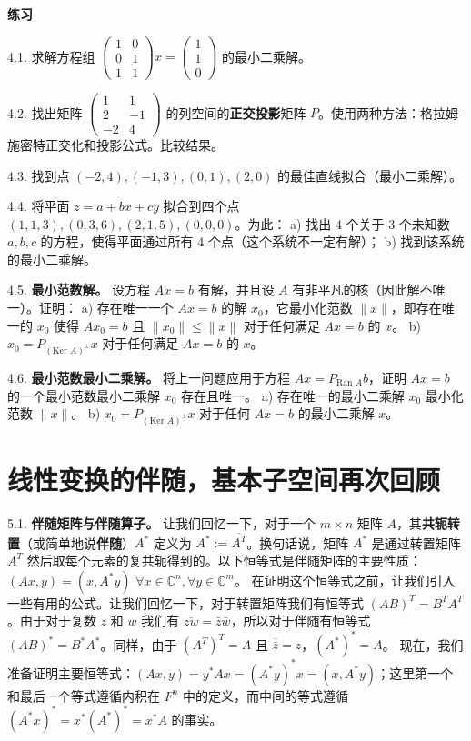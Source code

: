 \textbf{练习}~

4.1. 求解方程组 $\begin{pmatrix} 1 & 0 \\ 0 & 1 \\ 1 & 1 \end{pmatrix} x = \begin{pmatrix} 1 \\ 1 \\ 0 \end{pmatrix}$ 的最小二乘解。

4.2. 找出矩阵 $\begin{pmatrix} 1 & 1 \\ 2 & -1 \\ -2 & 4 \end{pmatrix}$ 的列空间的\textbf{正交投影}矩阵 $P$。使用两种方法：格拉姆-施密特正交化和投影公式。比较结果。

4.3. 找到点 $(−2, 4), (−1, 3), (0, 1), (2, 0)$ 的最佳直线拟合（最小二乘解）。

4.4. 将平面 $z = a + bx + cy$ 拟合到四个点 $(1, 1, 3), (0, 3, 6), (2, 1, 5), (0, 0, 0)$。为此：
a) 找出 4 个关于 3 个未知数 $a, b, c$ 的方程，使得平面通过所有 4 个点（这个系统不一定有解）；
b) 找到该系统的最小二乘解。

4.5. \textbf{最小范数解。} 设方程 $Ax = b$ 有解，并且设 $A$ 有非平凡的核（因此解不唯一）。证明：
a) 存在唯一一个 $Ax = b$ 的解 $x_0$，它最小化范数 $\|x\|$，即存在唯一的 $x_0$ 使得 $Ax_0 = b$ 且 $\|x_0\| \leq \|x\|$ 对于任何满足 $Ax = b$ 的 $x$。
b) $x_0 = P_{(\text{Ker } A)^\perp} x$ 对于任何满足 $Ax = b$ 的 $x$。

4.6. \textbf{最小范数最小二乘解。} 将上一问题应用于方程 $Ax = P_{\text{Ran } A} b$，证明 $A x = b$ 的一个最小范数最小二乘解 $x_0$ 存在且唯一。
a) 存在唯一的最小二乘解 $x_0$ 最小化范数 $\|x\|$。
b) $x_0 = P_{(\text{Ker } A)^\perp} x$ 对于任何 $Ax = b$ 的最小二乘解 $x$。




\section{线性变换的伴随，基本子空间再次回顾}

5.1. \textbf{伴随矩阵与伴随算子。} 让我们回忆一下，对于一个 $m \times n$ 矩阵 $A$，其\textbf{共轭转置}（或简单地说\textbf{伴随}）$A^*$ 定义为 $A^* := \overline{A^T}$。换句话说，矩阵 $A^*$ 是通过转置矩阵 $A^T$ 然后取每个元素的复共轭得到的。以下恒等式是伴随矩阵的主要性质：$(Ax, y) = (x, A^*y)$ $\forall x \in \mathbb{C}^n, \forall y \in \mathbb{C}^m$。
在证明这个恒等式之前，让我们引入一些有用的公式。让我们回忆一下，对于转置矩阵我们有恒等式 $(AB)^T = B^T A^T$。由于对于复数 $z$ 和 $w$ 我们有 $\overline{zw} = \bar{z}\bar{w}$，所以对于伴随有恒等式 $(AB)^* = B^*A^*$。同样，由于 $(A^T)^T = A$ 且 $\overline{\bar{z}} = z$，$(A^*)^* = A$。
现在，我们准备证明主要恒等式：$(Ax, y) = y^*Ax = (A^*y)^*x = (x, A^*y)$；这里第一个和最后一个等式遵循内积在 $F^n$ 中的定义，而中间的等式遵循 $(A^*x)^* = x^*(A^*)^* = x^*A$ 的事实。


